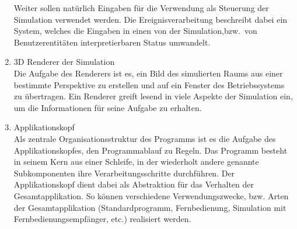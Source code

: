 \documentclass[11pt,twoside,a4paper]{article}
\begin{document}
\begin{enumerate}
Weiter sollen natürlich Eingaben für die Verwendung als Steuerung der Simulation verwendet werden. Die Ereignisverarbeitung beschreibt dabei ein System, welches die Eingaben in einen von der Simulation,bzw.~von Benutzerentitäten interpretierbaren Status umwandelt.
\item 3D Renderer der Simulation\\
Die Aufgabe des Renderers ist es, ein Bild des simulierten Raums aus einer bestimmte Perspektive zu erstellen und auf ein Fenster des Betriebssystems zu übertragen.
Ein Renderer greift lesend in viele Aspekte der Simulation ein, um die Informationen für seine Aufgabe zu erhalten.
\item Applikationskopf\\
Als zentrale Organisationsstruktur des Programms ist es die Aufgabe des Applikationskopfes, den Programmablauf zu Regeln. Das Programm besteht in seinem Kern aus einer Schleife, in der wiederholt andere genannte Subkomponenten ihre Verarbeitungsschritte durchführen. Der Applikationskopf dient dabei als Abstraktion für das Verhalten der Gesamtapplikation. So können verschiedene Verwendungszwecke, bzw. Arten der Gesamtapplikation (Standardprogramm, Fernbedienung, Simulation mit Fernbedienungsempfänger, etc.) realisiert werden.
\end{enumerate}
\end{document}

